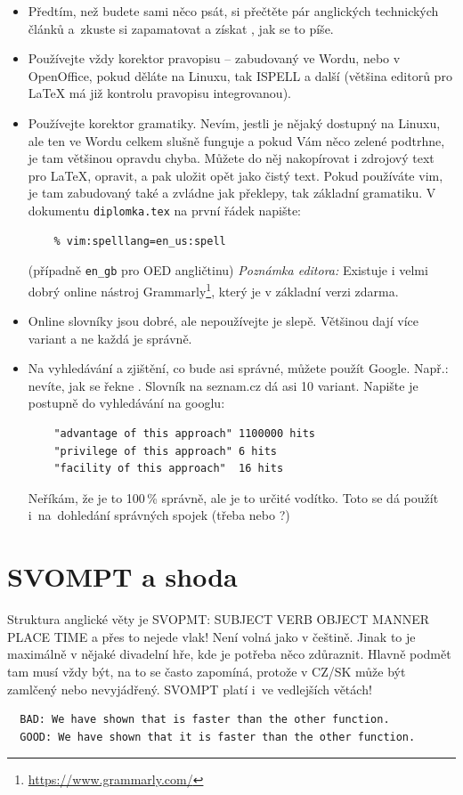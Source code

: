 \begin{itemize}
  \item{Předtím, než budete sami něco psát, si přečtěte pár anglických technických článků a~zkuste si zapamatovat a získat , jak se to píše.}
  \item{Používejte vždy korektor pravopisu -- zabudovaný ve Wordu, nebo v OpenOffice, pokud děláte na Linuxu, tak ISPELL a další (většina editorů pro \LaTeX{} má již kontrolu pravopisu integrovanou).}
  \item{Používejte korektor gramatiky. Nevím, jestli je nějaký dostupný na Linuxu, ale ten ve Wordu celkem slušně funguje a pokud Vám něco zelené podtrhne, je tam většinou opravdu chyba. Můžete do něj nakopírovat i zdrojový text pro \LaTeX{}, opravit, a pak uložit opět jako čistý text. Pokud používáte vim, je tam zabudovaný také a zvládne jak překlepy, tak základní gramatiku. V dokumentu \texttt{diplomka.tex} na první řádek napište: 
  \begin{verbatim}
    % vim:spelllang=en_us:spell
  \end{verbatim}
  (případně \texttt{en\_gb} pro OED angličtinu)
  \textit{Poznámka editora:} Existuje i velmi dobrý online nástroj Grammarly\footnote{\url{https://www.grammarly.com/}}, který je v základní verzi zdarma. 
  }
  \item{Online slovníky jsou dobré, ale nepoužívejte je slepě. Většinou dají více variant a ne každá je správně.}
  \item{\begin{samepage}Na vyhledávání a zjištění, co bude asi správné, můžete použít Google. Např.: nevíte, jak se řekne . Slovník na seznam.cz dá asi 10 variant. Napište je postupně do vyhledávání na googlu:
  \begin{verbatim}
    "advantage of this approach" 1100000 hits
    "privilege of this approach" 6 hits
    "facility of this approach"  16 hits
  \end{verbatim}
  Neříkám, že je to 100\,\% správně, ale je to určité vodítko. Toto se dá použít i~na~dohledání správných spojek (třeba  nebo ?)\end{samepage}}
\end{itemize}
       
\section{SVOMPT a shoda}

Struktura anglické věty je SVOPMT: SUBJECT VERB OBJECT MANNER PLACE TIME a přes to nejede vlak! Není volná jako v češtině. Jinak to je maximálně v nějaké divadelní hře, kde je potřeba něco zdůraznit. Hlavně podmět tam musí vždy být, na to se často zapomíná, protože v CZ/SK může být zamlčený nebo nevyjádřený. SVOMPT platí i~ve vedlejších větách!
\begin{verbatim}
  BAD: We have shown that is faster than the other function. 
  GOOD: We have shown that it is faster than the other function. 
\end{verbatim}

